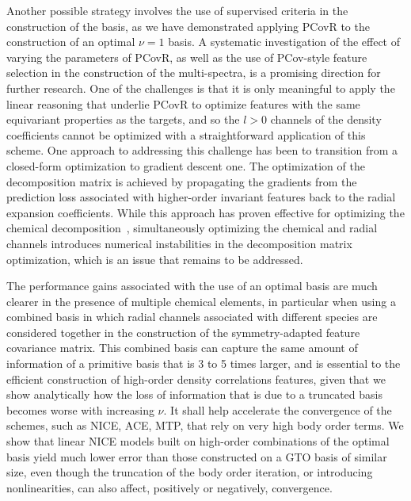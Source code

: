 Another possible strategy involves the use of supervised criteria in the construction of the basis, as we have demonstrated applying PCovR to the construction of an optimal $\nu=1$ basis.
A systematic investigation of the effect of varying the parameters of PCovR, as well as the use of PCov-style feature selection\cite{cers+21mlst} in the construction of the multi-spectra, is a promising direction for further research.
One of the challenges is that it is only meaningful to apply the linear reasoning that underlie PCovR to optimize features with the same equivariant properties as the targets, and so the $l>0$ channels of the density coefficients cannot be optimized with a straightforward application of this scheme.
One approach to addressing this challenge has been to transition from a closed-form optimization to gradient descent one.
The optimization of the decomposition matrix is achieved by propagating the gradients from the prediction loss associated with higher-order invariant features back to the radial expansion coefficients.
While this approach has proven effective for optimizing the chemical decomposition~\cite{lopanitsyna2023modeling}, simultaneously optimizing the chemical and radial channels introduces numerical instabilities in the decomposition matrix optimization, which is an issue that remains to be addressed.

The performance gains associated with the use of an optimal basis are much clearer in the presence of multiple chemical elements, in particular when using a combined basis in which radial channels associated with different species are considered together in the construction of the symmetry-adapted feature covariance matrix. 
This combined basis can capture the same amount of information of a primitive basis that is 3 to 5 times larger, and is essential to the efficient construction of high-order density correlations features, given that we show analytically how the loss of information that is due to a truncated basis becomes worse with increasing $\nu$. It shall help accelerate the convergence of the schemes, such as NICE, ACE, MTP, that rely on very high body order terms. 
We show that linear NICE models built on high-order combinations of the optimal basis yield much lower error than those constructed on a GTO basis of similar size, even though the truncation of the body order iteration, or introducing nonlinearities, can also affect, positively or negatively, convergence. 

